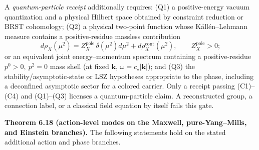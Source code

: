 A \emph{quantum-particle receipt} additionally requires: (Q1) a positive-energy vacuum
quantization and a physical Hilbert space obtained by constraint reduction or BRST cohomology;
(Q2) a physical two-point function whose K\"all\'en--Lehmann measure contains a
positive-residue massless contribution
\[
d\rho_X(\mu^2)
=Z_X^{\mathrm{pole}}\,\delta(\mu^2)d\mu^2+d\rho_X^{\mathrm{cont}}(\mu^2),
\qquad Z_X^{\mathrm{pole}}>0;
\]
or an equivalent joint energy--momentum spectrum containing a positive-residue
\(p^0>0,\ p^2=0\) mass shell (at fixed \(\mathbf k\),
\(\omega=c_\star|\mathbf k|\));
and (Q3) the stability/asymptotic-state or LSZ hypotheses appropriate to the phase, including a
deconfined asymptotic sector for a colored carrier. Only a receipt passing (C1)--(C4) and
(Q1)--(Q3) licenses a quantum-particle claim. A reconstructed group, a connection label, or a
classical field equation by itself fails this gate.

\textbf{Theorem 6.18 (action-level modes on the Maxwell, pure-Yang--Mills, and Einstein
branches).} The following statements hold on the stated additional action and phase branches.

